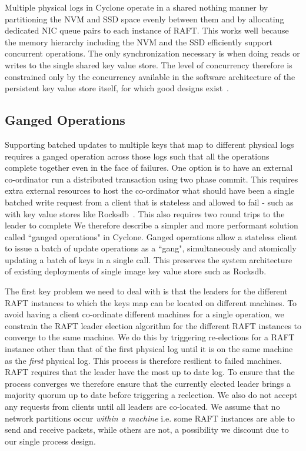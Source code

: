 \documentclass[twocolumn]{article}
\begin{document}
Multiple physical logs in Cyclone operate in a shared nothing manner by
partitioning the NVM and SSD space evenly between them and by allocating
dedicated NIC queue pairs to each instance of RAFT. This works well because the
memory hierarchy including the NVM and the SSD efficiently support concurrent
operations. The only synchronization necessary is when doing reads or writes to
the single shared key value store.  The level of concurrency therefore is
constrained only by the concurrency available in the software architecture of
the persistent key value store itself, for which good designs
exist~\cite{flodb}.

\subsection{Ganged Operations}
Supporting batched updates to multiple keys that map to different physical logs
requires a ganged operation across those logs such that all the operations
complete together even in the face of failures. One option is to have an
external co-ordinator run a distributed transaction using two phase commit. This
requires extra external resources to host the co-ordinator what should have been a single batched write request from a
client that is stateless and allowed to fail - such as with key value stores
like Rocksdb~\cite{rocksdb}. This also 
requires two round trips to the
leader to complete  We therefore describe a simpler and more performant
solution called ``ganged operations" in Cyclone. Ganged operations allow a
stateless client to issue a batch of update operations as a ``gang",
simultaneously and atomically updating a batch of keys in a single call. This preserves
the system architecture of existing deployments of single image key value store such as Rocksdb.

The first key problem we need to deal with is that the leaders for the different
RAFT instances to which the keys map can be located on different machines. To
avoid having a client co-ordinate different machines for a single operation, we
constrain the RAFT leader election algorithm for the different RAFT instances to
converge to the same machine. We do this by triggering re-elections for a RAFT
instance other than that of the first physical log until it is on the same
machine as the \emph{first} physical log. This process is therefore resilient to
failed machines. RAFT requires that the leader have the most up to date log. To
ensure that the process converges we therefore ensure that the currently elected
leader brings a majority quorum up to date before triggering a reelection. We
also do not accept any requests from clients until all leaders are
co-located. We assume that no network partitions occur \emph{within a machine}
i.e. some RAFT instances are able to send and receive packets, while others are
not, a possibility we discount due to our single process design.
\end{document}
